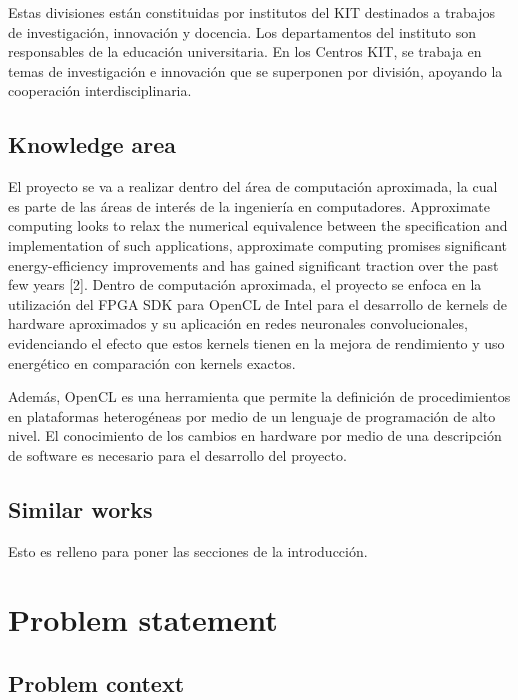 Estas divisiones están constituidas por institutos del KIT destinados a trabajos de investigación,
innovación y docencia. Los departamentos del instituto son responsables de la educación universitaria.
En los Centros KIT, se trabaja en temas de investigación e innovación que se superponen por división,
apoyando la cooperación interdisciplinaria.

\subsection{Knowledge area}

El proyecto se va a realizar dentro del área de computación aproximada, la cual es parte de las áreas de
interés de la ingeniería en computadores. Approximate computing looks to relax the numerical equivalence 
between the specification and implementation of such applications, approximate computing promises significant energy-efficiency
improvements and has gained significant traction over
the past few years [2]. Dentro de computación aproximada, el proyecto se enfoca en la utilización del
FPGA SDK para OpenCL de Intel para el desarrollo de kernels de hardware aproximados y su aplicación
en redes neuronales convolucionales, evidenciando el efecto que estos kernels tienen en la mejora de 
rendimiento y uso energético en comparación con kernels exactos. 

Además, OpenCL es una herramienta que permite la definición de procedimientos en plataformas heterogéneas 
por medio de un lenguaje de programación de alto nivel. El conocimiento de los cambios en hardware por medio 
de una descripción de software es necesario para el desarrollo del proyecto.

\subsection{Similar works}

Esto es relleno para poner las secciones de la introducción.

\section{Problem statement}

\subsection{Problem context}


